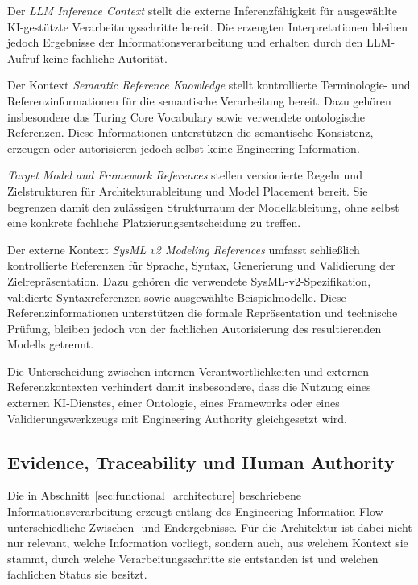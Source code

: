 Der \emph{LLM Inference Context} stellt die externe Inferenzfähigkeit für
ausgewählte KI-gestützte Verarbeitungsschritte bereit. Die erzeugten
Interpretationen bleiben jedoch Ergebnisse der Informationsverarbeitung und
erhalten durch den LLM-Aufruf keine fachliche Autorität.

Der Kontext \emph{Semantic Reference Knowledge} stellt kontrollierte
Terminologie- und Referenzinformationen für die semantische Verarbeitung
bereit. Dazu gehören insbesondere das Turing Core Vocabulary sowie verwendete
ontologische Referenzen. Diese Informationen unterstützen die semantische
Konsistenz, erzeugen oder autorisieren jedoch selbst keine
Engineering-Information.

\emph{Target Model and Framework References} stellen versionierte Regeln und
Zielstrukturen für Architekturableitung und Model Placement bereit. Sie
begrenzen damit den zulässigen Strukturraum der Modellableitung, ohne selbst
eine konkrete fachliche Platzierungsentscheidung zu treffen.

Der externe Kontext \emph{SysML v2 Modeling References} umfasst schließlich
kontrollierte Referenzen für Sprache, Syntax, Generierung und Validierung der
Zielrepräsentation. Dazu gehören die verwendete SysML-v2-Spezifikation,
validierte Syntaxreferenzen sowie ausgewählte Beispielmodelle. Diese
Referenzinformationen unterstützen die formale Repräsentation und technische
Prüfung, bleiben jedoch von der fachlichen Autorisierung des resultierenden
Modells getrennt.

Die Unterscheidung zwischen internen Verantwortlichkeiten und externen
Referenzkontexten verhindert damit insbesondere, dass die Nutzung eines
externen KI-Dienstes, einer Ontologie, eines Frameworks oder eines
Validierungswerkzeugs mit Engineering Authority gleichgesetzt wird.

\subsection{Evidence, Traceability und Human Authority}
\label{sec:evidence_authority}

Die in Abschnitt~\ref{sec:functional_architecture} beschriebene
Informationsverarbeitung erzeugt entlang des Engineering Information Flow
unterschiedliche Zwischen- und Endergebnisse. Für die Architektur ist dabei
nicht nur relevant, welche Information vorliegt, sondern auch, aus welchem
Kontext sie stammt, durch welche Verarbeitungsschritte sie entstanden ist und
welchen fachlichen Status sie besitzt.

